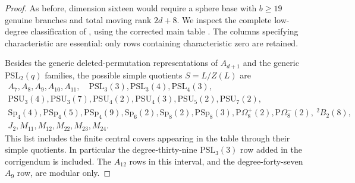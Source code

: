 \documentclass[11pt]{article}
\theoremstyle{definition}
\theoremstyle{remark}
\begin{document}
\begin{proof}
As before, dimension sixteen would require a sphere base with
$b\geq19$ genuine branches and total moving rank $2d+8$.
We inspect the complete low-degree classification of
\cite[Theorem~1 and Table~2]{HissMalle}, using the corrected
main table \cite[Table~2, pp.~103--106]{HissMalleCorrection}.
The columns specifying characteristic are essential: only rows
containing characteristic zero are retained.

Besides the generic deleted-permutation representations of
$A_{d+1}$ and the generic $\mathrm{PSL}_2(q)$ families, the
possible simple quotients $S=L/Z(L)$ are
\[
\begin{gathered}
 A_7,A_8,A_9,A_{10},A_{11},\quad
 \mathrm{PSL}_3(3),\mathrm{PSL}_3(4),\mathrm{PSL}_4(3),\\
 \mathrm{PSU}_3(4),\mathrm{PSU}_3(7),
 \mathrm{PSU}_4(2),\mathrm{PSU}_4(3),
 \mathrm{PSU}_5(2),\mathrm{PSU}_7(2),\\
 \mathrm{Sp}_4(4),\mathrm{PSp}_4(5),\mathrm{PSp}_4(9),
 \mathrm{Sp}_6(2),\mathrm{Sp}_8(2),\mathrm{PSp}_8(3),
 \mathrm{P}\Omega_8^+(2),\mathrm{P}\Omega_8^-(2),\ {}^2B_2(8),\\
 J_2,M_{11},M_{12},M_{22},M_{23},M_{24}.
\end{gathered}
\]
This list includes the finite central covers appearing in the
table through their simple quotients.  In particular the
degree-thirty-nine $\mathrm{PSL}_3(3)$ row added in the
corrigendum is included.  The $A_{12}$ rows in this interval,
and the degree-forty-seven $A_9$ row, are modular only.


\end{proof}
\end{document}
